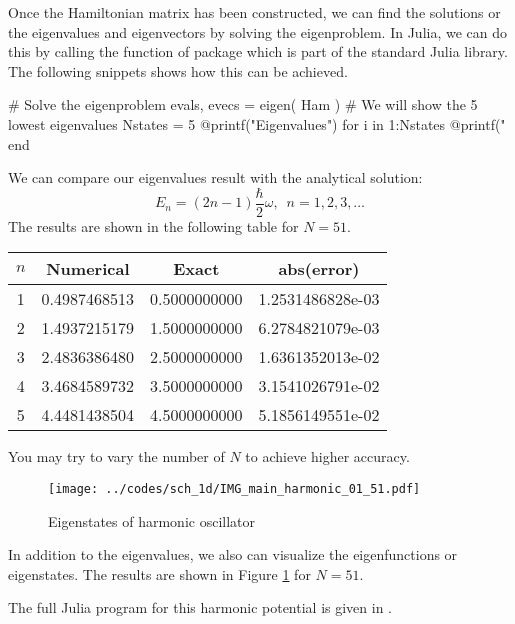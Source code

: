 Once the Hamiltonian matrix has been constructed, we can find the solutions or the eigenvalues
and eigenvectors by solving the eigenproblem. In Julia, we can do this by calling the 
function of  package which is part of the standard Julia library.
The following snippets shows how this can be achieved.
\begin{juliacode}
# Solve the eigenproblem
evals, evecs = eigen( Ham )
# We will show the 5 lowest eigenvalues
Nstates = 5
@printf("Eigenvalues\n")
for i in 1:Nstates
    @printf("%
end
\end{juliacode}

We can compare our eigenvalues result with the analytical solution:
\begin{equation}
E_{n} = (2n - 1)\frac{\hbar}{2}\omega,\,\,\,n = 1,2,3,\ldots
\end{equation}
The results are shown in the following table for $N=51$.
\begin{table}[H]
{\centering
\begin{tabular}{|c|c|c|c|}
\hline
$n$ & Numerical & Exact & abs(error) \\
\hline
1   &    0.4987468513   &    0.5000000000  &   1.2531486828e-03 \\
2   &    1.4937215179   &    1.5000000000  &   6.2784821079e-03 \\
3   &    2.4836386480   &    2.5000000000  &   1.6361352013e-02 \\
4   &    3.4684589732   &    3.5000000000  &   3.1541026791e-02 \\
5   &    4.4481438504   &    4.5000000000  &   5.1856149551e-02 \\
\hline
\end{tabular}
\par}
\end{table}
You may try to vary the number of $N$ to achieve higher accuracy.

\begin{figure}[H]
{\center
\texttt{[image: ../codes/sch\_1d/IMG\_main\_harmonic\_01\_51.pdf]}
\par}
\caption{Eigenstates of harmonic oscillator}
\label{fig:harm_eigenstates_N_51}
\end{figure}

In addition to the eigenvalues, we also can visualize the eigenfunctions or eigenstates. The results
are shown in Figure \ref{fig:harm_eigenstates_N_51} for $N=51$.

The full Julia program for this harmonic potential is given in .


